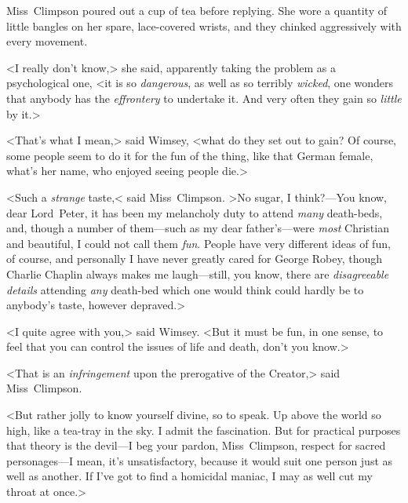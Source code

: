 Miss~Climpson poured out a cup of tea before replying. She wore a quantity of little bangles on her spare, lace-covered wrists, and they chinked aggressively with every movement.

<I really don't know,> she said, apparently taking the problem as a psychological one, <it is so \emph{dangerous}, as well as so terribly \emph{wicked}, one wonders that anybody has the \emph{effrontery} to undertake it. And very often they gain so \emph{little} by it.>

<That's what I mean,> said Wimsey, <what do they set out to gain? Of course, some people seem to do it for the fun of the thing, like that German female, what's her name, who enjoyed seeing people die.>

<Such a \emph{strange} taste,< said Miss~Climpson. >No sugar, I think?—You know, dear Lord~Peter, it has been my melancholy duty to attend \emph{many} death-beds, and, though a number of them—such as my dear father's—were \emph{most} Christian and beautiful, I could not call them \emph{fun}. People have very different ideas of fun, of course, and personally I have never greatly cared for George Robey, though Charlie Chaplin always makes me laugh—still, you know, there are \emph{disagreeable details} attending \emph{any} death-bed which one would think could hardly be to anybody's taste, however depraved.>

<I quite agree with you,> said Wimsey. <But it must be fun, in one sense, to feel that you can control the issues of life and death, don't you know.>

<That is an \emph{infringement} upon the prerogative of the Creator,> said Miss~Climpson.

<But rather jolly to know yourself divine, so to speak. Up above the world so high, like a tea-tray in the sky. I admit the fascination. But for practical purposes that theory is the devil—I beg your pardon, Miss~Climpson, respect for sacred personages—I mean, it's unsatisfactory, because it would suit one person just as well as another. If I've got to find a homicidal maniac, I may as well cut my throat at once.>


